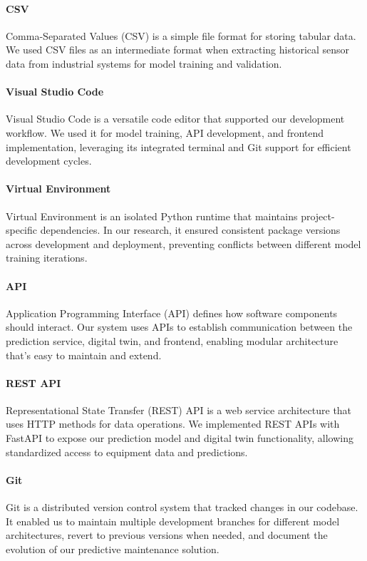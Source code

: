 \paragraph{CSV} Comma-Separated Values (CSV) is a simple file format for storing tabular data. We used CSV files as an intermediate format when extracting historical sensor data from industrial systems for model training and validation.

\paragraph{Visual Studio Code} Visual Studio Code is a versatile code editor that supported our development workflow. We used it for model training, API development, and frontend implementation, leveraging its integrated terminal and Git support for efficient development cycles.

\paragraph{Virtual Environment} Virtual Environment is an isolated Python runtime that maintains project-specific dependencies. In our research, it ensured consistent package versions across development and deployment, preventing conflicts between different model training iterations.

\paragraph{API} Application Programming Interface (API) defines how software components should interact. Our system uses APIs to establish communication between the prediction service, digital twin, and frontend, enabling modular architecture that's easy to maintain and extend.

\paragraph{REST API} Representational State Transfer (REST) API is a web service architecture that uses HTTP methods for data operations. We implemented REST APIs with FastAPI to expose our prediction model and digital twin functionality, allowing standardized access to equipment data and predictions.

\paragraph{Git} Git is a distributed version control system that tracked changes in our codebase. It enabled us to maintain multiple development branches for different model architectures, revert to previous versions when needed, and document the evolution of our predictive maintenance solution.

